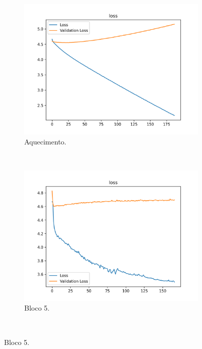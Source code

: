 \begin{figure}[H]
    \centering
    \caption{Evolução da \textit{Loss} no conjunto de dados \textit{Food}-101.}
    \label{results:fig:datasets:4}
     \begin{subfigure}[t]{0.45\textwidth}
         \centering
         \includegraphics[width=1\linewidth]{recursos/imagens/results/food_wp_loss.png}
         \caption{Aquecimento.}
         \label{results:fig:datasets:4.1}
     \end{subfigure}%
     ~ 
     \begin{subfigure}[t]{0.45\textwidth}
         \centering
         \includegraphics[width=1\linewidth]{recursos/imagens/results/food_loss1.png}
         \caption{Bloco 5.}
         \label{results:fig:datasets:4.2}
     \end{subfigure}%
     ~ 
     

\end{figure}
